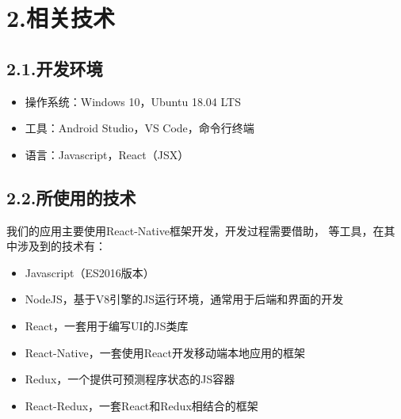 \documentclass{article}
\begin{document}
\section{2.\hspace*{0.5em}相关技术}\label{section}%

\subsection{2.1.\hspace*{0.5em}开发环境}\label{section}%

\begin{itemize}[noitemsep,topsep=\mdcompacttopsep]%

\item{}操作系统：Windows 10，Ubuntu 18.04 LTS%

\item{}工具：Android Studio，VS Code，命令行终端%

\item{}语言：Javascript，React（JSX）%
\end{itemize}%

\subsection{2.2.\hspace*{0.5em}所使用的技术}\label{section}%

\noindent{}我们的应用主要使用React-Native框架开发，开发过程需要借助，
等工具，在其中涉及到的技术有：%

\begin{itemize}[noitemsep,topsep=\mdcompacttopsep]%

\item{}Javascript（ES2016版本）%

\item{}NodeJS，基于V8引擎的JS运行环境，通常用于后端和界面的开发%

\item{}React，一套用于编写UI的JS类库%

\item{}React-Native，一套使用React开发移动端本地应用的框架%

\item{}Redux，一个提供可预测程序状态的JS容器%

\item{}React-Redux，一套React和Redux相结合的框架%
\end{itemize}%
\end{document}
